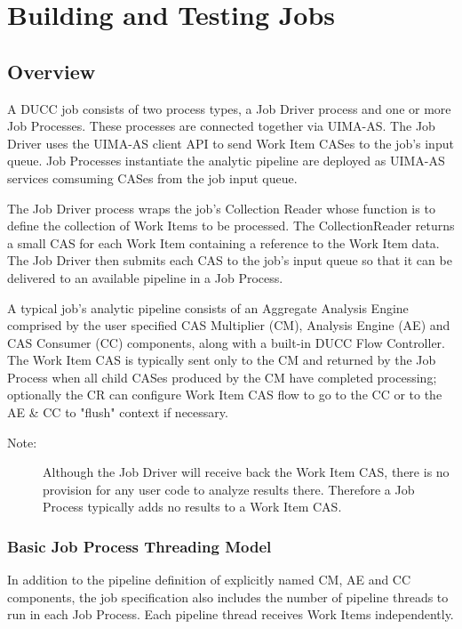 \chapter{Building and Testing Jobs}

\section{Overview}

A DUCC job consists of two process types, a Job Driver process and one or more
Job Processes. These processes are connected together via UIMA-AS.
The Job Driver uses the UIMA-AS client API to send Work Item CASes 
to the job's input queue. Job Processes instantiate the analytic pipeline are deployed
as UIMA-AS services comsuming CASes from the job input queue.

The Job Driver process wraps the job's Collection Reader whose
function is to define the collection of Work Items to be processed.
The CollectionReader returns a small CAS for each Work Item containing a
reference to the Work Item data. The Job Driver then submits each CAS to the job's
input queue so that it can be delivered to an available pipeline in a Job Process.

A typical job's analytic pipeline consists of an Aggregate Analysis Engine comprised by
the user specified CAS Multiplier (CM), Analysis Engine (AE) and CAS
Consumer (CC) components, along with a built-in DUCC Flow Controller.
The Work Item CAS is typically sent only to the CM and returned by
the Job Process when all child CASes produced by the CM have completed
processing; optionally the CR can configure Work Item CAS flow to go to the CC 
or to the AE \& CC to "flush" context if necessary. 

	\begin{description}
	    \item[Note:] Although the Job Driver will receive back the Work Item CAS, 
	    there is no provision for any user code to analyze results there. Therefore a
		Job Process typically adds no results to a Work Item CAS.
	\end{description}

   \subsection{Basic Job Process Threading Model}
   In addition to the pipeline definition of explicitly named CM, AE and CC components, the job
   specification also includes the number of pipeline threads to run in each
   Job Process. Each pipeline thread receives Work Items independently.

